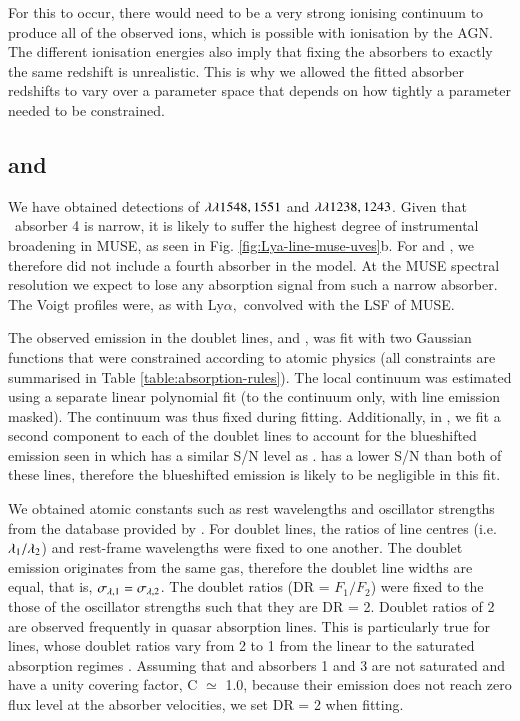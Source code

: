 For this to occur, there would need to be a very strong ionising continuum to produce all of the observed ions, which is possible with ionisation by the AGN. The different ionisation energies also imply that fixing the absorbers to exactly the same redshift is unrealistic. This is why we allowed the fitted absorber redshifts to vary over a parameter space that depends on how tightly a parameter needed to be constrained. 

\subsection{ and }\label{section:CIV-NV-fit}

We have obtained detections of  $\lambda\lambda1548,1551$ and  $\lambda\lambda1238,1243$. Given that \lya~absorber 4 is narrow, it is likely to suffer the highest degree of instrumental broadening in MUSE, as seen in Fig. \ref{fig:Lya-line-muse-uves}b. For  and , we therefore did not include a fourth absorber in the model. At the MUSE spectral resolution we expect to lose any absorption signal from such a narrow absorber. The Voigt profiles were, as with Ly$\alpha,$  convolved with the LSF of MUSE. 

The observed emission in the doublet lines,  and , was fit with two Gaussian functions that were constrained according to atomic physics (all constraints are summarised in Table \ref{table:absorption-rules}). The local continuum was estimated using a  separate linear polynomial fit (to the continuum only, with line emission masked). The continuum was thus fixed during fitting. Additionally, in , we fit a second component to each of the doublet lines to account for the blueshifted emission seen in  which has a similar S/N level as .  has a lower S/N than both of these lines, therefore the blueshifted emission is likely to be negligible in this fit. 

We obtained atomic constants such as rest wavelengths and oscillator strengths from the database provided by \citet{cashman2017}. For doublet lines, the ratios of line centres (i.e. $\lambda_1/\lambda_2$) and rest-frame wavelengths were fixed to one another. The doublet emission originates from the same gas, therefore the doublet line widths are equal, that is, $\sigma_{\lambda,1} = \sigma_{\lambda,2}$. The doublet ratios (DR = $F_1/F_2$) were fixed to the those of the oscillator strengths such that they are DR = 2. Doublet ratios of 2 are observed frequently in quasar absorption lines. This is particularly true for  lines, whose doublet ratios vary from 2 to 1 from the linear to the saturated absorption regimes \citep{peroux2004}. Assuming that  and  absorbers 1 and 3 are not saturated and have a unity covering factor, C $\simeq$ 1.0, because their emission does not reach zero flux level at the absorber velocities, we set DR = 2 when fitting.

